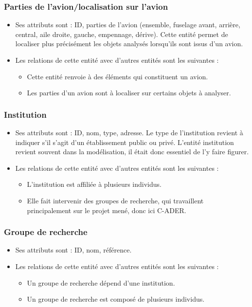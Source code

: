\subsubsection{Parties de l'avion/localisation sur l'avion}
\begin{itemize}
    \item Ses attributs sont : ID, parties de l'avion (ensemble, fuselage avant, arrière, central, aile droite, gauche, empennage, dérive). Cette entité permet de localiser plus précisément les objets analysés lorsqu’ils sont issus d’un avion.
    \item Les relations de cette entité avec d’autres entités sont les suivantes :
    \begin{itemize}
        \item Cette entité renvoie à des éléments qui constituent un avion.
        \item Les parties d’un avion sont à localiser sur certains objets à analyser.
    \end{itemize}
\end{itemize}
\subsubsection{Institution}
\begin{itemize}
    \item Ses attributs sont : ID, nom, type, adresse. Le type de l’institution revient à indiquer s’il s’agit d’un établissement public ou privé. L’entité institution revient souvent dans la modélisation, il était donc essentiel de l’y faire figurer.
    \item Les relations de cette entité avec d’autres entités sont les suivantes :
    \begin{itemize}
        \item L’institution est affiliée à plusieurs individus.
        \item Elle fait intervenir des groupes de recherche, qui travaillent principalement sur le projet mené, donc ici C-ADER.
    \end{itemize}
\end{itemize}
\subsubsection{Groupe de recherche}
\begin{itemize}
    \item Ses attributs sont : ID, nom, référence.
    \item Les relations de cette entité avec d’autres entités sont les suivantes :
    \begin{itemize}
        \item Un groupe de recherche dépend d’une institution.
        \item Un groupe de recherche est composé de plusieurs individus.
    \end{itemize}
\end{itemize}
